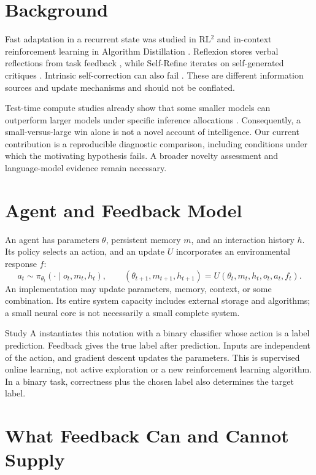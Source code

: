 \documentclass[11pt]{article}
\begin{document}
\section{Background}
Fast adaptation in a recurrent state was studied in RL$^2$ \cite{duan} and
in-context reinforcement learning in Algorithm Distillation \cite{laskin}.
Reflexion stores verbal reflections from task feedback \cite{shinn}, while
Self-Refine iterates on self-generated critiques \cite{madaan}. Intrinsic
self-correction can also fail \cite{huang}. These are different information
sources and update mechanisms and should not be conflated.

Test-time compute studies already show that some smaller models can outperform
larger models under specific inference allocations \cite{snell}. Consequently,
a small-versus-large win alone is not a novel account of intelligence. Our
current contribution is a reproducible diagnostic comparison, including
conditions under which the motivating hypothesis fails. A broader novelty
assessment and language-model evidence remain necessary.

\section{Agent and Feedback Model}
An agent has parameters $\theta$, persistent memory $m$, and an interaction
history $h$. Its policy selects an action, and an update $U$ incorporates an
environmental response $f$:
\[
 a_t\sim\pi_{\theta_t}(\cdot\mid o_t,m_t,h_t),\qquad
 (\theta_{t+1},m_{t+1},h_{t+1})=U(\theta_t,m_t,h_t,o_t,a_t,f_t).
\]
An implementation may update parameters, memory, context, or some combination.
Its entire system capacity includes external storage and algorithms; a small
neural core is not necessarily a small complete system.

Study A instantiates this notation with a binary classifier whose action is a
label prediction. Feedback gives the true label after prediction. Inputs are
independent of the action, and gradient descent updates the parameters. This
is supervised online learning, not active exploration or a new reinforcement
learning algorithm. In a binary task, correctness plus the chosen label also
determines the target label.

\section{What Feedback Can and Cannot Supply}
\end{document}
